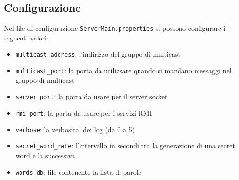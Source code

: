 \subsection{Configurazione}

Nel file di configurazione \texttt{ServerMain.properties} si possono configurare i seguenti valori:
\begin{itemize}
	\item \texttt{multicast\_address}: l'indirizzo del gruppo di multicast
	\item \texttt{multicast\_port}: la porta da utilizzare quando si mandano messaggi nel gruppo di multicast
	\item \texttt{server\_port}: la porta da usare per il server socket
	\item \texttt{rmi\_port}: la porta da usare per i servizi RMI
	\item \texttt{verbose}: la verbosita' dei log (da 0 a 5)
	\item \texttt{secret\_word\_rate}: l'intervallo in secondi tra la generazione di una secret word e la successiva
	\item \texttt{words\_db}: file contenente la lista di parole	
\end{itemize}